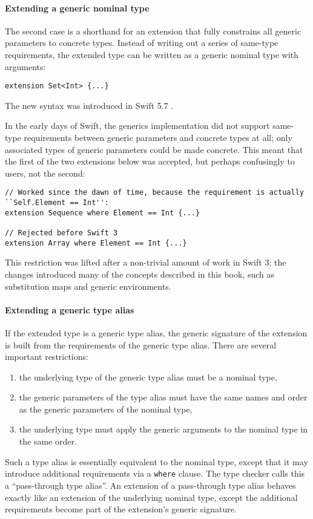 \documentclass[a4paper,headsepline,bibliography=totoc,toc=flat,fleqn,twoside=semi]{scrbook}
\theoremstyle{definition}
\theoremstyle{definition}
\theoremstyle{definition}
\begin{document}
\paragraph{Extending a generic nominal type}
The second case is a shorthand for an extension that fully constrains all generic parameters to concrete types. Instead of writing out a series of same-type requirements, the extended type can be written as a generic nominal type with arguments:
\begin{Verbatim}
extension Set<Int> {...}
\end{Verbatim}
The new syntax was introduced in Swift 5.7 \cite{se0361}.

In the early days of Swift, the generics implementation did not support same-type requirements between generic parameters and concrete types at all; only associated types of generic parameters could be made concrete. This meant that the first of the two extensions below was accepted, but perhaps confusingly to users, not the second:
\begin{Verbatim}
// Worked since the dawn of time, because the requirement is actually ``Self.Element == Int'':
extension Sequence where Element == Int {...}

// Rejected before Swift 3
extension Array where Element == Int {...}
\end{Verbatim}
This restriction was lifted after a non-trivial amount of work in Swift 3; the changes introduced many of the concepts described in this book, such as substitution maps and generic environments.

\paragraph{Extending a generic type alias}
If the extended type is a generic type alias, the generic signature of the extension is built from the requirements of the generic type alias. There are several important restrictions:
\begin{enumerate}
\item the underlying type of the generic type alias must be a nominal type,
\item the generic parameters of the type alias must have the same names and order as the generic parameters of the nominal type,
\item the underlying type must apply the generic arguments to the nominal type in the same order.
\end{enumerate}
Such a type alias is essentially equivalent to the nominal type, except that it may introduce additional requirements via a \texttt{where} clause. The type checker calls this a ``pass-through type alias''. An extension of a pass-through type alias behaves exactly like an extension of the underlying nominal type, except the additional requirements become part of the extension's generic signature.
\end{document}
